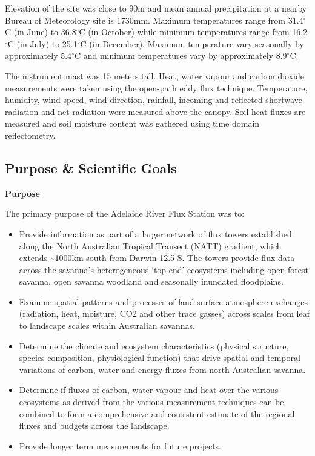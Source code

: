 \documentclass[11pt,a4paper]{article}
\begin{document}
Elevation of the site was close to 90m and mean annual  precipitation at a nearby Bureau of Meteorology site is 1730mm. Maximum  temperatures range from 31.4$^\circ$C (in June) to 36.8$^\circ$C (in  October) while minimum temperatures range from 16.2$^\circ$C (in July) to  25.1$^\circ$C (in December). Maximum temperature vary seasonally by  approximately 5.4$^\circ$C and minimum temperatures vary by approximately  8.9$^\circ$C.

The instrument mast was 15 meters  tall. Heat, water vapour and carbon dioxide measurements were taken using the  open-path eddy flux technique. Temperature, humidity, wind speed, wind  direction, rainfall, incoming and reflected shortwave radiation and net  radiation were measured above the canopy. Soil heat fluxes are measured and soil  moisture content was gathered using time domain reflectometry.

\subsection*{Purpose \& Scientific Goals}

\textbf{Purpose}

The  primary purpose of the Adelaide River Flux Station was to:

\begin{itemize}
  \item Provide  information as part of a larger network of flux towers established along the  North Australian Tropical Transect (NATT) gradient, which extends \textasciitilde{}1000km  south from Darwin 12.5 S.  The towers provide flux data across the savanna’s heterogeneous ‘top end’  ecosystems including open forest savanna, open savanna woodland and seasonally  inundated floodplains.
  \item Examine spatial patterns and processes of  land-surface-atmosphere exchanges (radiation, heat, moisture, CO2 and other  trace gasses) across scales from leaf to landscape scales within Australian  savannas.
  \item Determine  the climate and ecosystem characteristics (physical structure,  species composition, physiological function) that drive spatial and temporal variations of  carbon, water and energy fluxes from north Australian savanna.
  \item Determine if fluxes of carbon, water vapour and  heat over the various ecosystems as derived from the various measurement  techniques can be combined to form a comprehensive and consistent estimate of  the regional fluxes and budgets across the landscape.
  \item Provide  longer term measurements for future projects.
\end{itemize}
\end{document}
